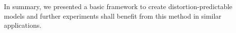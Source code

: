 \documentclass[a4paper,12pt]{report}
\begin{document}
In summary, we presented a basic framework to create distortion-predictable models and further experiments shall benefit from this method in similar applications.


{}


\nocite{lecun2004learning}
\end{document}
